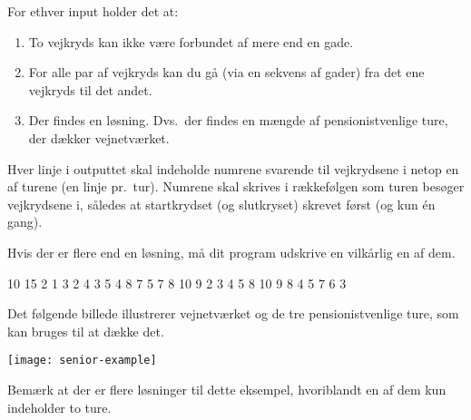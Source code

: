 \documentclass{boi2014-dk}
\begin{document}
    For ethver input holder det at:

    \begin{enumerate}
        \item To vejkryds kan ikke være forbundet af mere end en gade.
        \item For alle par af vejkryds kan du gå (via en sekvens af gader)
            fra det ene vejkryds til det andet.
        \item Der findes en løsning. Dvs.~der findes en mængde af
            pensionistvenlige ture, der dækker vejnetværket.
    \end{enumerate}

    \Output
    Hver linje i outputtet skal indeholde numrene svarende til vejkrydsene i
    netop en af turene (en linje pr.~tur). Numrene skal skrives i rækkefølgen
    som turen besøger vejkrydsene i, således at startkrydset (og slutkryset)
    skrevet først (og kun én gang).

    Hvis der er flere end en løsning, må dit program udskrive en vilkårlig
    en af dem.

    \Example

    \example
    {
        10 15  2  1 3  2 4  3 5  4 8  7  5 7  8  10  9
    }
    {
        2 3 4 5 8 10 9  8 4  5 7 6 3
    }
    {
        Det følgende billede illustrerer vejnetværket og de tre
        pensionistvenlige ture, som kan bruges til at dække det.

        \texttt{[image: senior-example]}

        Bemærk at der er flere løsninger til dette eksempel, hvoriblandt
        en af dem kun indeholder to ture.
    }
\end{document}
